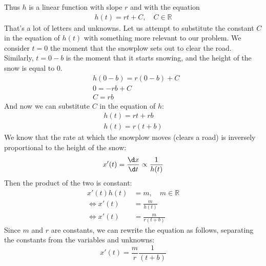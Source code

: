 \documentclass[a4paper,12pt]{article}
\begin{document}
    Thus $h$ is a linear function with slope $r$ and with the equation
    \begin{align*}
        h(t) = r t+ C, \quad C \in \mathbb{R}
    \end{align*}
    That's a lot of letters and unknowns. Let us attempt to substitute the constant $C$ in the equation of $h(t)$ with something more relevant to our problem.
    We consider $t = 0$ the moment that the snowplow sets out to clear the road. Similarly, $t = 0-b$ is the moment that it starts snowing, and the height of the snow is equal to $0$.
    \begin{align*}
        &h(0-b) = r (0-b) + C \\
        &0 = -rb + C \\
        &\boxed{C = rb}
    \end{align*}
    And now we can substitute $C$ in the equation of $h$:
    \begin{align*}
        h(t) = rt + rb \\
        h(t) = r(t+b)
    \end{align*}
    We know that the rate at which the snowplow moves (clears a road) is inversely proportional to the height of the snow:
    \begin{align*}
        x'(t) = \frac{\d x}{\d t} \propto \frac{1}{h(t)}
    \end{align*}
    Then the product of the two is constant:
    \begin{align*}
        x'(t) h(t) &= m, \quad m \in \mathbb{R} \\
        \iff x'(t) &= \frac{m}{h(t)} \\
        \iff x'(t) &= \frac{m}{r(t+b)}
    \end{align*}
    Since $m$ and $r$ are constants, we can rewrite the equation as follows, separating the constants from the variables and unknowns:
    \begin{equation*}
        x'(t) = \frac{m}{r} \frac{1}{(t+b)}
    \end{equation*}

\end{document}
